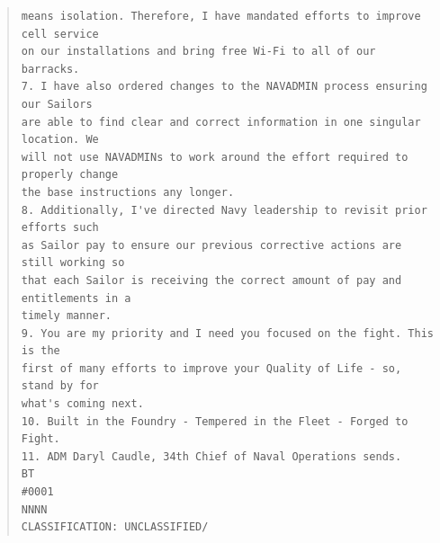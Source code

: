 \documentclass[../main.tex]{subfiles}
\begin{document}
\begin{quote}
\begin{verbatim}
means isolation. Therefore, I have mandated efforts to improve cell service
on our installations and bring free Wi-Fi to all of our barracks.
7. I have also ordered changes to the NAVADMIN process ensuring our Sailors
are able to find clear and correct information in one singular location. We
will not use NAVADMINs to work around the effort required to properly change
the base instructions any longer.
8. Additionally, I've directed Navy leadership to revisit prior efforts such
as Sailor pay to ensure our previous corrective actions are still working so
that each Sailor is receiving the correct amount of pay and entitlements in a
timely manner.
9. You are my priority and I need you focused on the fight. This is the
first of many efforts to improve your Quality of Life - so, stand by for
what's coming next.
10. Built in the Foundry - Tempered in the Fleet - Forged to Fight.
11. ADM Daryl Caudle, 34th Chief of Naval Operations sends.
BT
#0001
NNNN
CLASSIFICATION: UNCLASSIFIED/
\end{verbatim}
\end{quote}
\end{document}
